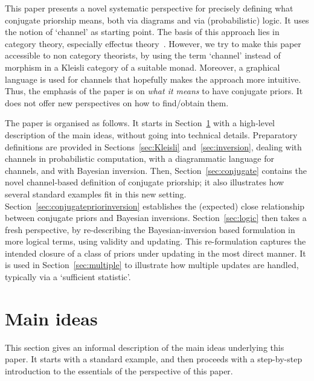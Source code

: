 \documentclass{mscs}
\begin{document}

This paper presents a novel systematic perspective for precisely
defining what conjugate priorship means, both via diagrams and via
(probabilistic) logic. It uses the notion of `channel' as starting
point. The basis of this approach lies in category theory, especially
effectus theory~\cite{Jacobs15d,ChoJWW15b}. However, we try to make
this paper accessible to non category theorists, by using the term
`channel' instead of morphism in a Kleisli category of a suitable
monad. Moreover, a graphical language is used for channels that
hopefully makes the approach more intuitive. Thus, the emphasis of the
paper is on \emph{what it means} to have conjugate priors.  It does
not offer new perspectives on how to find/obtain them.

The paper is organised as follows. It starts in
Section~\ref{sec:ideas} with a high-level description of the main
ideas, without going into technical details. Preparatory definitions
are provided in Sections~\ref{sec:Kleisli} and~\ref{sec:inversion},
dealing with channels in probabilistic computation, with a
diagrammatic language for channels, and with Bayesian inversion.
Then, Section~\ref{sec:conjugate} contains the novel channel-based
definition of conjugate priorship; it also illustrates how several
standard examples fit in this new
setting. Section~\ref{sec:conjugatepriorinversion} establishes the
(expected) close relationship between conjugate priors and Bayesian
inversions. Section~\ref{sec:logic} then takes a fresh perspective, by
re-describing the Bayesian-inversion based formulation in more logical
terms, using validity and updating. This re-formulation captures the
intended closure of a class of priors under updating in the most
direct manner. It is used in Section~\ref{sec:multiple} to illustrate
how multiple updates are handled, typically via a `sufficient
statistic'.



\section{Main ideas}\label{sec:ideas}

This section gives an informal description of the main ideas
underlying this paper. It starts with a standard example, and then
proceeds with a step-by-step introduction to the essentials of the
perspective of this paper.
\end{document}
